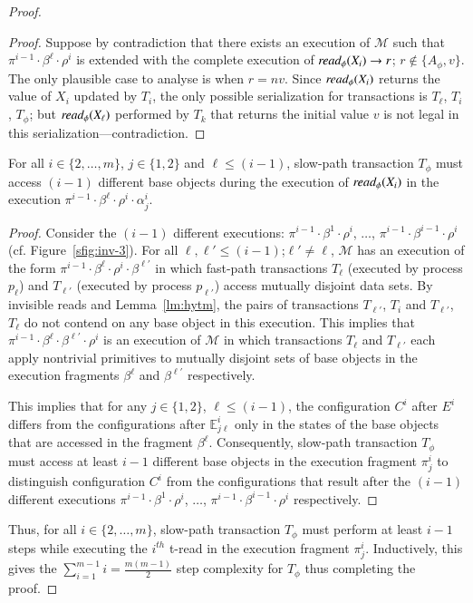 \begin{proof}
\begin{proof}
		Suppose by contradiction that there exists an execution of $\mathcal{M}$ such that
		$\pi^{i-1}\cdot\beta^{\ell}\cdot \rho^i$ is extended with the complete execution
		of $\textit{read}_{\phi}(X_i) \rightarrow r$; $r \not\in \{A_{\phi},v\}$. 
		The only plausible case to analyse is when $r=nv$.
		Since $\textit{read}_{\phi}(X_i)$ returns the value of $X_i$ updated by $T_i$, 
		the only possible serialization for transactions is $T_{\ell}$, $T_i$, $T_{\phi}$; but $\textit{read}_{\phi}(X_{\ell})$
		performed by $T_k$ that returns the initial value $v$
		is not legal in this serialization---contradiction.
	\end{proof}
	\begin{claim}
		For all $i\in \{2,\ldots, m\}$, $j\in \{1,2\}$ and $\ell \leq (i-1)$, slow-path transaction $T_{\phi}$ must access
		$(i-1)$ different base objects during the execution of $\textit{read}_{\phi}(X_i)$ in the execution
		$\pi^{i-1}\cdot \beta^{\ell}\cdot \rho^i \cdot \alpha_j^i$.
	\end{claim}
	\begin{proof}
		Consider the $(i-1)$ different executions: 
		$\pi^{i-1}\cdot\beta^{1}\cdot \rho^i$, $\ldots$, $\pi^{i-1}\cdot\beta^{i-1}\cdot \rho^i$ (cf. Figure~\ref{sfig:inv-3}).
		For all $\ell, \ell' \leq (i-1)$;$\ell' \neq \ell$, 
		$\mathcal{M}$ has an execution of the form $\pi^{i-1}\cdot \beta^{\ell}\cdot \rho^i \cdot \beta^{\ell'}$
		in which fast-path transactions $T_{\ell}$ (executed by process $p_{\ell}$) and $T_{\ell'}$ (executed by process $p_{\ell'}$) access mutually disjoint data sets.
		By invisible reads and Lemma~\ref{lm:hytm}, the pairs of transactions $T_{\ell'}$, $T_{i}$ and $T_{\ell'}$, $T_{\ell}$
		do not contend on any base object in this execution.
		This implies that $\pi^{i-1}\cdot \beta^{\ell} \cdot \beta^{\ell'} \cdot \rho^i$ is an execution of $\mathcal{M}$ in which
		transactions $T_{\ell}$ and $T_{\ell'}$ each apply nontrivial primitives
		to mutually disjoint sets of base objects in the execution fragments $\beta^{\ell}$ and $\beta^{\ell'}$ respectively.
		
		This implies that for any $j\in \{1,2\}$, $\ell \leq (i-1)$, the configuration $C^i$ after $E^i$ differs from the configurations
		after $\mathbb{E}_{j\ell}^{i}$ only in the states of the base objects that are accessed in the fragment $\beta^{\ell}$.
		Consequently, slow-path transaction $T_{\phi}$ must access at least $i-1$ different base objects
		in the execution fragment $\pi_j^i$
		to distinguish configuration $C^i$ from the configurations
		that result after the $(i-1)$ different executions 
		$\pi^{i-1}\cdot\beta^{1}\cdot \rho^i$, $\ldots$, $\pi^{i-1}\cdot\beta^{i-1}\cdot \rho^i$ respectively.
	\end{proof}
	Thus, for all $i \in \{2,\ldots, m\}$, slow-path transaction $T_{\phi}$ must perform at least $i-1$ steps 
	while executing the $i^{th}$ t-read in the execution fragment $\pi_{j}^i$. 
	Inductively, this gives the $\sum\limits_{i=1}^{m-1} i=\frac{m(m-1)}{2}$ step complexity for $T_{\phi}$ thus completing the proof.
\end{proof}

